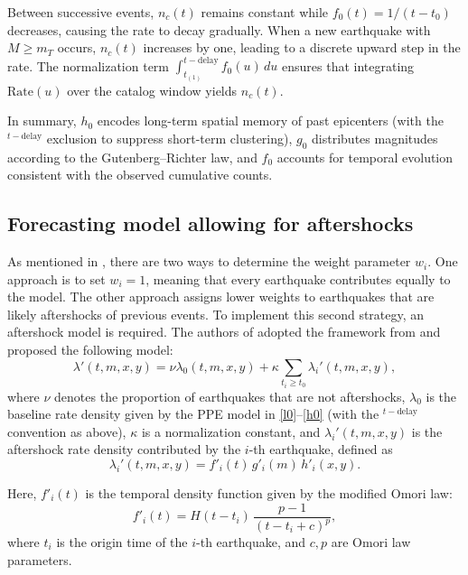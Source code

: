 \documentclass[extra,mreferee]{gji}
\theoremstyle{lemma}
\begin{document}
Between successive events, $n_c(t)$ remains constant while $f_0(t) = 1/(t - t_0)$ decreases, causing the rate to decay gradually. When a new earthquake with $M \ge m_T$ occurs, $n_c(t)$ increases by one, leading to a discrete upward step in the rate.  
The normalization term $\int_{t_{(1)}}^{t-\mathrm{delay}} f_0(u)\,du$ ensures that integrating $\mathrm{Rate}(u)$ over the catalog window yields $n_c(t)$.  

In summary, $h_0$ encodes long-term spatial memory of past epicenters (with the ${}^{t-\mathrm{delay}}$ exclusion to suppress short-term clustering), $g_0$ distributes magnitudes according to the Gutenberg--Richter law, and $f_0$ accounts for temporal evolution consistent with the observed cumulative counts.

\subsection{Forecasting model allowing for aftershocks}

As mentioned in \cite{RE}, there are two ways to determine the weight parameter $w_i$. One approach is to set $w_i = 1$, meaning that every earthquake contributes equally to the model. The other approach assigns lower weights to earthquakes that are likely aftershocks of previous events. To implement this second strategy, an aftershock model is required. The authors of \cite{RE} adopted the framework from \cite{CM,Ogata1,Ogata2,Ogata3} and proposed the following model:
\begin{equation}\label{l'tmxy}
    \lambda'(t,m,x,y) = \nu \lambda_0(t,m,x,y) + \kappa \sum_{t_i \geq t_0} \lambda_i'(t,m,x,y),
\end{equation}
where $\nu$ denotes the proportion of earthquakes that are not aftershocks, $\lambda_0$ is the baseline rate density given by the PPE model in \eqref{l0}--\eqref{h0} (with the ${}^{t-\mathrm{delay}}$ convention as above), $\kappa$ is a normalization constant, and $\lambda_i'(t,m,x,y)$ is the aftershock rate density contributed by the $i$-th earthquake, defined as
\begin{equation}\label{l'itmxy}
    \lambda_i'(t,m,x,y) = f'_i(t)\, g'_i(m)\, h'_i(x,y).
\end{equation}

Here, $f'_i(t)$ is the temporal density function given by the modified Omori law:
\begin{equation}\label{f2it}
    f'_i(t) = H(t - t_i)\, \frac{p - 1}{(t - t_i + c)^p},
\end{equation}
where $t_i$ is the origin time of the $i$-th earthquake, and $c, p$ are Omori law parameters.  
\end{document}
